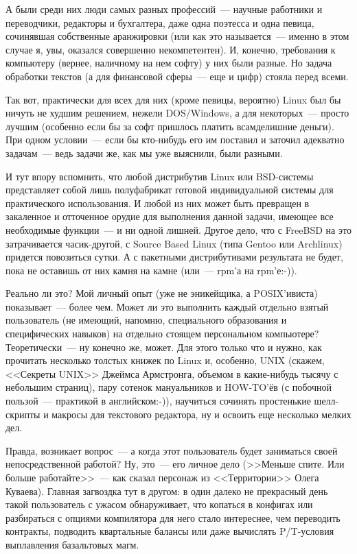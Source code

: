 А были среди них люди самых разных профессий~--- научные работники и переводчики, редакторы и бухгалтера, даже одна поэтесса и одна певица, сочинявшая собственные аранжировки (или как это называется~--- именно в этом случае я, увы, оказался совершенно некомпетентен). И, конечно, требования к компьютеру (вернее, наличному на нем софту) у них были разные. Но задача обработки текстов (а для финансовой сферы~--- еще и цифр) стояла перед всеми.

Так вот, практически для всех для них (кроме певицы, вероятно) Linux был бы ничуть не худшим решением, нежели DOS/Windows, а для некоторых~--- просто лучшим (особенно если бы за софт пришлось платить всамделишние деньги). При одном условии~--- если бы кто-нибудь его им поставил и заточил адекватно задачам~--- ведь задачи же, как мы уже выяснили, были разными.

И тут впору вспомнить, что любой дистрибутив Linux или BSD-системы представляет собой лишь полуфабрикат готовой индивидуальной системы для практического использования. И любой из них может быть превращен в закаленное и отточенное орудие для выполнения данной задачи, имеющее все необходимые функции~--- и ни одной лишней. Другое дело, что с FreeBSD на это затрачивается часик-другой, с Source Based Linux (типа Gentoo или Archlinux) придется повозиться сутки. А с пакетными дистрибутивами результата не будет, пока не оставишь от них камня на камне (или~--- rpm'а на rpm'е:-)).

Реально ли это? Мой личный опыт (уже не эникейщика, а POSIX'ивиста) показывает~--- более чем. Может ли это выполнить каждый отдельно взятый пользователь (не имеющий, напомню, специального образования и специфических навыков) на отдельно стоящем персональном компьютере? Теоретически~--- ну конечно же, может. Для этого только что и нужно, как прочитать несколько толстых книжек по Linux и, особенно, UNIX (скажем, <<Секреты UNIX>> Джеймса Армстронга, объемом в какие-нибудь тысячу с небольшим страниц), пару сотенок мануальников и HOW-TO'ёв (с побочной пользой~--- практикой в английском:-)), научиться сочинять простенькие шелл-скрипты и макросы для текстового редактора, ну и освоить еще несколько мелких дел.

Правда, возникает вопрос~--- а когда этот пользователь будет заниматься своей непосредственной работой? Ну, это~--- его личное дело (>>Меньше спите. Или больше работайте>>~--- как сказал персонаж из <<Территории>> Олега Куваева). Главная загвоздка тут в другом: в один далеко не прекрасный день такой пользователь с ужасом обнаруживает, что копаться в конфигах или разбираться с опциями компилятора для него стало интереснее, чем переводить контракты, подводить квартальные балансы или даже вычислять P/T-условия выплавления базальтовых магм.

